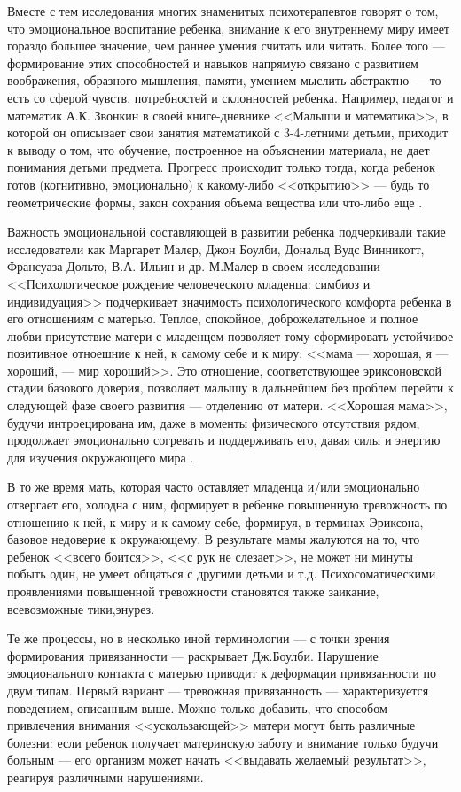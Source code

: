 \documentclass{../../common/thesisbyxetex}
\begin{document}
Вместе с тем исследования многих знаменитых психотерапевтов говорят о том, что эмоциональное 
воспитание ребенка, внимание к его внутреннему миру имеет гораздо большее значение, чем раннее 
умения считать или читать. Более того --- формирование этих способностей и навыков напрямую 
связано с развитием воображения, образного мышления, памяти, умением мыслить абстрактно --- то 
есть со сферой чувств, потребностей и склонностей ребенка. Например, педагог и математик А.К. 
Звонкин в своей книге-дневнике <<Малыши и математика>>, в которой он описывает свои занятия 
математикой с 3-4-летними детьми, приходит к выводу о том, что обучение, построенное на объяснении 
материала, не дает понимания детьми предмета. Прогресс происходит только тогда, когда ребенок готов 
(когнитивно, эмоционально) к какому-либо <<открытию>>  --- будь то геометрические формы, закон 
сохрания объема вещества или что-либо еще \cite{zvon}.  

Важность эмоциональной составляющей в развитии ребенка подчеркивали такие исследователи как 
Маргарет Малер, Джон Боулби, Дональд Вудс Винникотт, Франсуаза Дольто, В.А. Ильин и др.
М.Малер в своем исследовании <<Психологическое рождение человеческого младенца: симбиоз и 
индивидуация>> подчеркивает значимость психологического комфорта ребенка в его отношениям с 
матерью. Теплое, спокойное, доброжелательное и полное любви присутствие матери с младенцем 
позволяет тому сформировать устойчивое позитивное отноешние к ней, к самому себе и к миру: 
<<мама --- хорошая, я --- хороший, --- мир хороший>>. Это отношение, соответствующее эриксоновской 
стадии базового доверия, позволяет малышу в дальнейшем без проблем перейти к следующей фазе своего 
развития --- отделению от матери. <<Хорошая мама>>, будучи интроецирована им, даже в моменты 
физического отсутствия рядом, продолжает эмоционально согревать и поддерживать его, давая силы и 
энергию для изучения окружающего мира \cite{maler}. 

В то же время мать, которая часто оставляет 
младенца и/или эмоционально отвергает его, холодна с ним, формирует в ребенке повышенную 
тревожность по отношению к ней, к миру и к самому себе, формируя, в терминах Эриксона, базовое 
недоверие к окружающему. В результате мамы жалуются на то, что ребенок <<всего боится>>, <<с рук 
не слезает>>, не может ни минуты побыть один, не умеет общаться с другими детьми и т.д. 
Психосоматическими проявлениями повышенной тревожности становятся также заикание, всевозможные 
тики,энурез.

Те же процессы, но в несколько иной терминологии --- с точки зрения формирования привязанности 
--- раскрывает Дж.Боулби. Нарушение эмоционального контакта с матерью приводит к деформации 
привязанности по двум типам. Первый вариант --- тревожная привязанность --- характеризуется 
поведением, описанным выше. Можно только добавить, что способом привлечения внимания 
<<ускользающей>> матери могут быть различные болезни: если ребенок получает материнскую заботу и 
внимание только будучи больным --- его организм может начать <<выдавать желаемый результат>>, 
реагируя различными нарушениями. 
\end{document}
